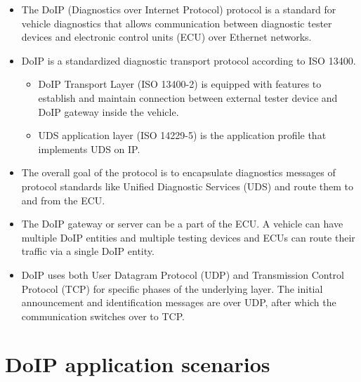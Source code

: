 \begin{itemize}

\item The DoIP (Diagnostics over Internet Protocol) protocol is a standard for vehicle diagnostics that allows communication 
between diagnostic tester devices and electronic control units (ECU) over Ethernet networks.

\item DoIP is a standardized diagnostic transport protocol according to ISO 13400.
    \begin{itemize}

    \item DoIP Transport Layer (ISO 13400-2) is equipped with features to establish and maintain connection between external 
    tester device and DoIP gateway inside the vehicle.
    
    \item UDS application layer (ISO 14229-5) is the application profile that implements UDS on IP.

    \end{itemize}

\item The overall goal of the protocol is to encapsulate diagnostics messages of protocol standards like Unified Diagnostic Services (UDS)
and route them to and from the ECU.

\item The DoIP gateway or server can be a part of the ECU. A vehicle can have multiple DoIP entities and multiple testing devices and 
ECUs can route their traffic via a single DoIP entity. 

\item DoIP uses both User Datagram Protocol (UDP) and Transmission Control Protocol (TCP) for specific phases of the underlying layer. 
The initial announcement and identification messages are over UDP, after which the communication switches over to TCP.

\end{itemize}



\section{DoIP application scenarios}

